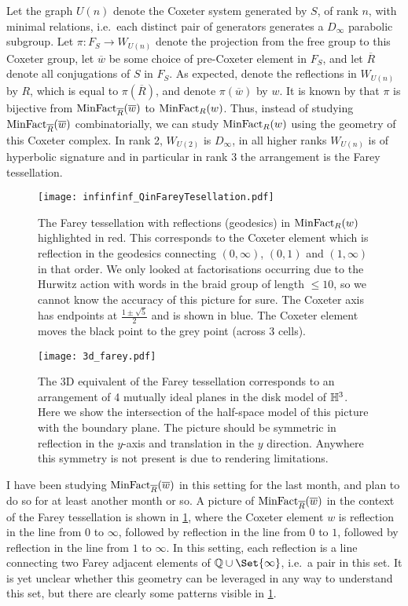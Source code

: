 Let the graph $U(n)$ denote the Coxeter system generated by $S$, of rank $n$, with minimal relations, i.e.~each distinct pair of generators generates a  $D_\infty$ parabolic subgroup.
Let $\pi \colon F_S \to W_{U(n)}$ denote the projection from the free group to this Coxeter group, let $\overline{w}$ be some choice of pre-Coxeter element in  $F_S$, and let $\overline{R}$ denote all conjugations of $S$ in $F_S$.
As expected, denote the reflections in $W_{U(n)}$ by $R$, which is equal to $\pi(\overline{R})$, and denote $\pi(\overline{w})$ by $w$.
It is known by \cite[Corollary 4.6]{bessis_dual_2006} that $\pi$ is bijective from $\operatorname{MinFact}_{\overline{R}}(\overline{w})$ to $\operatorname{MinFact}_R(w)$.
Thus, instead of studying $\operatorname{MinFact}_{\overline{R}}(\overline{w})$ combinatorially, we can study  $\operatorname{MinFact}_R(w)$ using the geometry of this Coxeter complex.
In rank 2,  $W_{U(2)}$ is  $D_\infty$, in all higher ranks  $W_{U(n)}$ is of hyperbolic signature and in particular in rank 3 the arrangement is the Farey tessellation.

\begin{figure}[ht]
	\centering
	\texttt{[image: infinfinf\_QinFareyTesellation.pdf]}
	\caption{The Farey tessellation with reflections (geodesics) in $\operatorname{MinFact}_R(w)$ highlighted in red.
		This corresponds to the Coxeter element which is reflection in the geodesics connecting $(0,\infty)$,  $(0,1)$ and  $(1,\infty)$ in that order.
		We only looked at factorisations occurring due to the Hurwitz action with words in the braid group of length  $\leq 10$, so we cannot know the accuracy of this picture for sure.
		The Coxeter axis has endpoints at $\frac{1 \pm \sqrt{5}}{2}$ and is shown in blue.
		The Coxeter element moves the black point to the grey point (across 3 cells).}
	\label{fig:Q_in_farey_tesellation}
\end{figure}
\begin{figure}[ht]
	\centering
	\texttt{[image: 3d\_farey.pdf]}
	\caption{The 3D equivalent of the Farey tessellation corresponds to an arrangement of 4 mutually ideal planes in the disk model of $\mathbb{H}^3$.
		Here we show the intersection of the half-space model of this picture with the boundary plane.
		The picture should be symmetric in reflection in the  $y$-axis and translation in the $y$ direction.
		Anywhere this symmetry is not present is due to rendering limitations.}
	\label{fig:3d_farey_tesellation}
\end{figure}


I have been studying $\operatorname{MinFact}_{\overline{R}}(\overline{w})$ in this setting for the last month, and plan to do so for at least another month or so.
A picture of $\operatorname{MinFact}_{\overline{R}}(\overline{w})$ in the context of the Farey tessellation is shown in \cref{fig:Q_in_farey_tesellation}, where the Coxeter element $w$ is reflection in the line from  0 to $\infty$, followed by reflection in the line from  $0$ to  $1$, followed by reflection in the line from  $1$ to $\infty$.
In this setting, each reflection is a line connecting two Farey adjacent elements of $\Q \cup \Set{\infty}$, i.e.~a pair in this set.
It is yet unclear whether this geometry can be leveraged in any way to understand this set, but there are clearly some patterns visible in \cref{fig:Q_in_farey_tesellation}.

